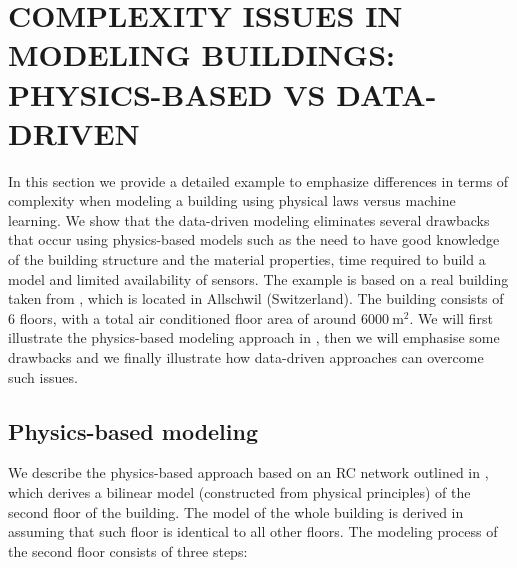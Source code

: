 



\section{COMPLEXITY ISSUES IN MODELING BUILDINGS: PHYSICS-BASED VS DATA-DRIVEN}\label{secModelingIssuesExample}
\textcolor[rgb]{0,0,1}{In this section we provide a detailed example to emphasize differences in terms of complexity when modeling a building using physical laws versus machine learning. We show that the data-driven modeling eliminates several drawbacks that occur using physics-based models such as the need to have good knowledge of the building structure and the material properties, time required to build a model and limited availability of sensors. The example is based on a real building taken from \cite{Sturzenegger2016}, which is located in Allschwil (Switzerland). The building consists of 6 floors, with a total air conditioned floor area of around $6000\ \mathrm{m^2}$. We will first illustrate the physics-based modeling approach in \cite{Sturzenegger2016}, then we will emphasise some drawbacks and we finally illustrate how data-driven approaches can overcome such issues.
}




\subsection{Physics-based modeling}
\label{SSS:physics-based}

\textcolor[rgb]{0,0,1}{We describe the physics-based approach based on an RC network outlined in \cite{Sturzenegger2016}, which derives a bilinear model (constructed from physical principles) of the second floor of the building. The model of the whole building is derived in \cite{Sturzenegger2016} assuming that such floor is identical to all other floors. The modeling process of the second floor consists of three steps:
}

